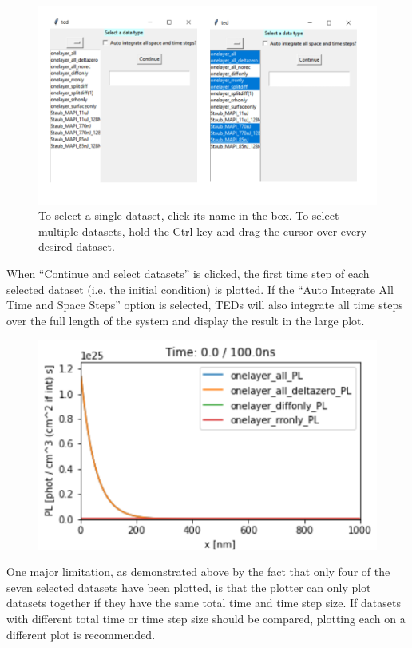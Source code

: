 \documentclass[11pt,letterpaper,titlepage]{article}
\begin{document}
		\begin{figure}[H]
			\label{fig:plotting_example}
			\centering
			\includegraphics[scale=1]{"plotting_example"}
			\caption{To select a single dataset, click its name in the box. 
			To select multiple datasets, hold the Ctrl key and drag the cursor over every desired dataset.
			}
		\end{figure}
	
		\par When “Continue and select datasets” is clicked, the first time step of each selected dataset (i.e. the initial condition) is plotted. If the “Auto Integrate All Time and Space Steps” option is selected, TEDs will also integrate all time steps over the full length of the system and display the result in the large plot.
		
		\begin{figure}[H]
			\label{fig:analyze_example}
			\centering
			\includegraphics[scale=1]{"analyze_example"}
		\end{figure}
	
		\par One major limitation, as demonstrated above by the fact that only four of the seven selected datasets have been plotted, is that the plotter can only plot datasets together if they have the same total time and time step size. If datasets with different total time or time step size should be compared, plotting each on a different plot is recommended.
		
\end{document}
